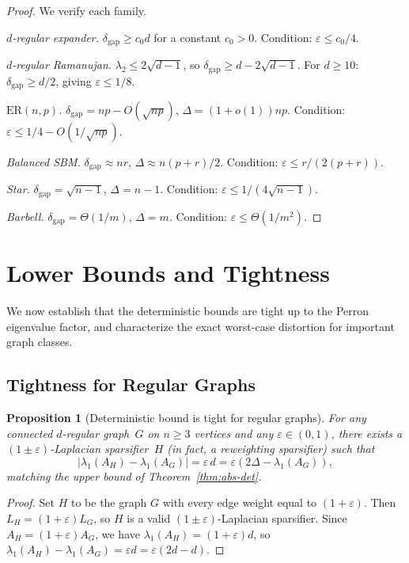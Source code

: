 \documentclass[11pt]{article}
\newtheorem{proposition}[theorem]{Proposition}
\theoremstyle{definition}
\newcommand{\eps}{\varepsilon}
\newcommand{\lamH}{\lambda_1(A_H)}
\newcommand{\lamG}{\lambda_1(A_G)}
\newcommand{\AG}{A_G}
\newcommand{\AH}{A_H}
\newcommand{\LG}{L_G}
\newcommand{\LH}{L_H}
\begin{document}
\begin{proof}
We verify each family.

\medskip\noindent\emph{$d$-regular expander.}
$\delta_{\mathrm{gap}} \geq c_0 d$ for a constant $c_0 > 0$.
Condition: $\eps \leq c_0/4$.

\medskip\noindent\emph{$d$-regular Ramanujan.}
$\lambda_2 \leq 2\sqrt{d-1}$, so $\delta_{\mathrm{gap}} \geq d - 2\sqrt{d-1}$.
For $d \geq 10$: $\delta_{\mathrm{gap}} \geq d/2$, giving $\eps \leq 1/8$.

\medskip\noindent\emph{$\mathrm{ER}(n,p)$.}
$\delta_{\mathrm{gap}} = np - O(\sqrt{np})$, $\Delta = (1+o(1))np$.
Condition: $\eps \leq 1/4 - O(1/\sqrt{np})$.

\medskip\noindent\emph{Balanced SBM.}
$\delta_{\mathrm{gap}} \approx nr$, $\Delta \approx n(p+r)/2$.
Condition: $\eps \leq r/(2(p+r))$.

\medskip\noindent\emph{Star.}
$\delta_{\mathrm{gap}} = \sqrt{n-1}$, $\Delta = n-1$.
Condition: $\eps \leq 1/(4\sqrt{n-1})$.

\medskip\noindent\emph{Barbell.}
$\delta_{\mathrm{gap}} = \Theta(1/m)$, $\Delta = m$.
Condition: $\eps \leq \Theta(1/m^2)$.
\end{proof}


\section{Lower Bounds and Tightness}\label{sec:lower}

We now establish that the deterministic bounds are tight up to the
Perron eigenvalue factor, and characterize the exact worst-case distortion for important
graph classes.

\subsection{Tightness for Regular Graphs}

\begin{proposition}[Deterministic bound is tight for regular graphs]\label{prop:tight-regular}
For any connected $d$-regular graph~$G$ on $n \geq 3$ vertices and any $\eps \in (0, 1)$,
there exists a $(1\pm\eps)$-Laplacian sparsifier~$H$ (in fact, a reweighting sparsifier)
such that
\[
|\lamH - \lamG| = \eps\,d = \eps(2\Delta - \lamG),
\]
matching the upper bound of Theorem~\ref{thm:abs-det}.
\end{proposition}

\begin{proof}
Set $H$ to be the graph $G$ with every edge weight equal to $(1 + \eps)$.
Then $\LH = (1+\eps)\LG$, so $H$ is a valid $(1\pm\eps)$-Laplacian sparsifier.
Since $\AH = (1+\eps)\AG$, we have $\lamH = (1+\eps)d$,
so $\lamH - \lamG = \eps d = \eps(2d - d)$.
\end{proof}
\end{document}
